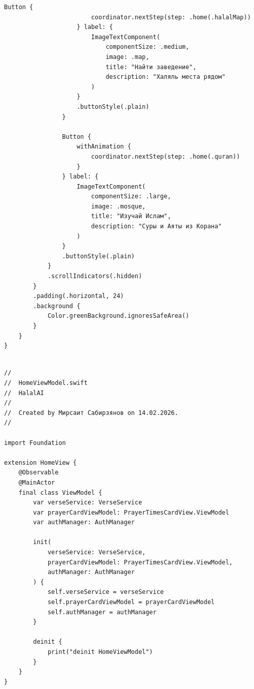 \begin{lstlisting}[basicstyle=\tiny\ttfamily,breaklines=true]
                    Button {
                        coordinator.nextStep(step: .home(.halalMap))
                    } label: {
                        ImageTextComponent(
                            componentSize: .medium,
                            image: .map,
                            title: "Найти заведение",
                            description: "Халяль места рядом"
                        )
                    }
                    .buttonStyle(.plain)
                }
                
                Button {
                    withAnimation {
                        coordinator.nextStep(step: .home(.quran))
                    }
                } label: {
                    ImageTextComponent(
                        componentSize: .large,
                        image: .mosque,
                        title: "Изучай Ислам",
                        description: "Суры и Аяты из Корана"
                    )
                }
                .buttonStyle(.plain)
            }
            .scrollIndicators(.hidden)
        }
        .padding(.horizontal, 24)
        .background {
            Color.greenBackground.ignoresSafeArea()
        }
    }
}
\end{lstlisting}

\begin{lstlisting}[basicstyle=\tiny\ttfamily,breaklines=true]

//
//  HomeViewModel.swift
//  HalalAI
//
//  Created by Мирсаит Сабирзянов on 14.02.2026.
//

import Foundation

extension HomeView {
    @Observable
    @MainActor
    final class ViewModel {
        var verseService: VerseService
        var prayerCardViewModel: PrayerTimesCardView.ViewModel
        var authManager: AuthManager

        init(
            verseService: VerseService,
            prayerCardViewModel: PrayerTimesCardView.ViewModel,
            authManager: AuthManager
        ) {
            self.verseService = verseService
            self.prayerCardViewModel = prayerCardViewModel
            self.authManager = authManager
        }
        
        deinit {
            print("deinit HomeViewModel")
        }
    }
}
\end{lstlisting}

